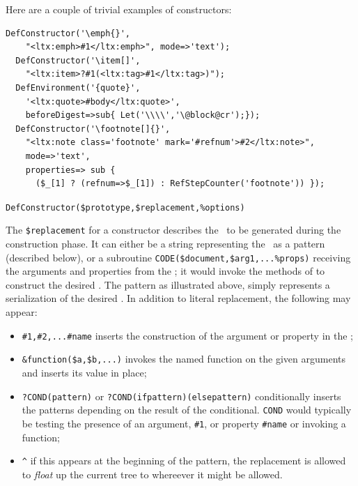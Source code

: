 \documentclass{book}
\newcommand{\ltxcode}{\lstinline[style=latexml]}
\begin{document}
Here are a couple of trivial examples of constructors:
\begin{lstlisting}[style=latexml]
  DefConstructor('\emph{}',
    "<ltx:emph>#1</ltx:emph>", mode=>'text');
  DefConstructor('\item[]',
    "<ltx:item>?#1(<ltx:tag>#1</ltx:tag>)");
  DefEnvironment('{quote}',   
    '<ltx:quote>#body</ltx:quote>',
    beforeDigest=>sub{ Let('\\\\','\@block@cr');});
  DefConstructor('\footnote[]{}',
    "<ltx:note class='footnote' mark='#refnum'>#2</ltx:note>",
    mode=>'text',
    properties=> sub { 
      ($_[1] ? (refnum=>$_[1]) : RefStepCounter('footnote')) });
\end{lstlisting}

\par\noindent\ltxcode|DefConstructor($prototype,$replacement,%
\par
The  \ltxcode|$replacement| for a constructor describes the \XML\ to
be generated during the construction phase. It can either be a string
representing the \XML\ as a pattern (described below), or a
subroutine \ltxcode|CODE($document,$arg1,...%
receiving the arguments and properties from the ;
it would invoke the methods of  to construct the desired \XML.
The pattern as illustrated above, simply represents a serialization of the
desired \XML.  In addition to literal replacement, the following may appear:
\begin{itemize}
\item \ltxcode|#1,#2,...#name| inserts the construction of the argument
or property in the \XML;
\item \ltxcode|&function($a,$b,...)| invokes the named function on the
given arguments and inserts its value in place;
\item \ltxcode|?COND(pattern)| or \ltxcode|?COND(ifpattern)(elsepattern)|
conditionally inserts the patterns depending on the result of the conditional.
\texttt{COND} would typically be testing the presence of an argument, \ltxcode|#1|,
or property \ltxcode|#name| or invoking a function;
\item \ltxcode|^| if this appears at the beginning of the pattern,
the replacement is allowed to \emph{float} up the current tree to whereever
it might be allowed.
\end{itemize}
\end{document}
